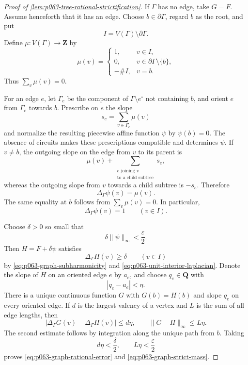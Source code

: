 \begin{proof}[Proof of
\cref{lem:p063-tree-rational-strictification}]
If \(\Gamma\) has no edge, take \(G=F\).  Assume henceforth that it has an
edge.  Choose \(b\in\partial\Gamma\), regard \(b\) as the root, and put
\[
                 I=V(\Gamma)\setminus\partial\Gamma.
\]
Define \(\mu:V(\Gamma)\to\mathbf Z\) by
\[
 \mu(v)=
 \begin{cases}
  1,&v\in I,\\
  0,&v\in\partial\Gamma\setminus\{b\},\\
  -\#I,&v=b.
 \end{cases}
\]
Thus \(\sum_v\mu(v)=0\).

For an edge \(e\), let \(\Gamma_e\) be the component of
\(\Gamma\setminus e^\circ\) not containing \(b\), and orient \(e\) from
\(\Gamma_e\) towards \(b\).  Prescribe on \(e\) the slope
\[
                         s_e=\sum_{v\in\Gamma_e}\mu(v)
\]
and normalize the resulting piecewise affine function \(\psi\) by
\(\psi(b)=0\).  The absence of circuits makes these prescriptions
compatible and determines \(\psi\).  If \(v\ne b\), the outgoing slope on
the edge from \(v\) to its parent is
\[
 \mu(v)+\sum_{\substack{e\text{ joining }v\\
                        \text{to a child subtree}}}s_e,
\]
whereas the outgoing slope from \(v\) towards a child subtree is
\(-s_e\).  Therefore
\[
                         \Delta_\Gamma\psi(v)=\mu(v).
\]
The same equality at \(b\) follows from \(\sum_v\mu(v)=0\).  In
particular,
\begin{equation}
\label{eq:p063-unit-interior-laplacian}
                         \Delta_\Gamma\psi(v)=1
                         \qquad(v\in I).
\end{equation}

Choose \(\delta>0\) so small that
\[
                   \delta\lVert\psi\rVert_\infty
                   <\frac{\varepsilon}{2}.
\]
Then \(H=F+\delta\psi\) satisfies
\[
                         \Delta_\Gamma H(v)\geq\delta
                         \qquad(v\in I)
\]
by \eqref{eq:p063-graph-subharmonicity} and
\eqref{eq:p063-unit-interior-laplacian}.  Denote the slope of \(H\) on an
oriented edge \(e\) by \(a_e\), and choose \(q_e\in\mathbf Q\) with
\[
                         |q_e-a_e|<\eta.
\]
There is a unique continuous function \(G\) with \(G(b)=H(b)\) and slope
\(q_e\) on every oriented edge.  If \(d\) is the largest valency of a
vertex and \(L\) is the sum of all edge lengths, then
\[
 |\Delta_\Gamma G(v)-\Delta_\Gamma H(v)|\leq d\eta,
 \qquad
 \lVert G-H\rVert_\infty\leq L\eta.
\]
The second estimate follows by integration along the unique path from
\(b\).  Taking
\[
              d\eta<\frac{\delta}{2},
              \qquad
              L\eta<\frac{\varepsilon}{2}
\]
proves \eqref{eq:p063-graph-rational-error} and
\eqref{eq:p063-graph-strict-mass}.
\end{proof}

